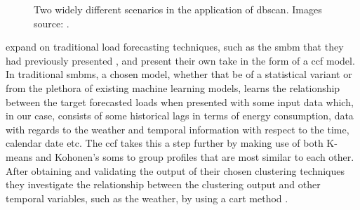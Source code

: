 \begin{figure}[hbt!]
        \begin{adjustwidth}{-0.5cm}{-0.5cm}%
                \myfloatalign
                 \quad
                 \quad
                \caption{Two widely different scenarios in the application of \gls{dbscan}. Images source: \cite{Kong} .}
        \end{adjustwidth}
\end{figure}

\noindent \newline \citet{Yildiz} expand on traditional load forecasting techniques, such as the \gls{smbm} that they had previously presented \cite{Yildiz2}, and present their own take in the form of a \gls{ccf} model. In traditional \glspl{smbm}, a chosen model, whether that be of a statistical variant or from the plethora of existing machine learning models, learns the relationship between the target forecasted loads when presented with some input data which, in our case, consists of some historical lags in terms of energy consumption, data with regards to the weather and temporal information with respect to the time, calendar date etc. The \gls{ccf} takes this a step further by making use of both K-means and Kohonen's \glspl{som} \cite{Kohonen} to group profiles that are most similar to each other. After obtaining and validating the output of their chosen clustering techniques they investigate the relationship between the clustering output and other temporal variables, such as the weather, by using a \gls{cart} method \cite{James}.

